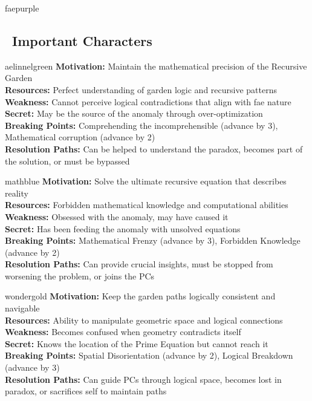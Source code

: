 \documentclass[11pt]{article}
\begin{document}
\begin{campaignsection}{faepurple}
\subsection*{\faUsers\ Important Characters}

\begin{npcbox}{aelinnelgreen}
\textbf{Motivation:} Maintain the mathematical precision of the Recursive Garden\\
\textbf{Resources:} Perfect understanding of garden logic and recursive patterns\\
\textbf{Weakness:} Cannot perceive logical contradictions that align with fae nature\\
\textbf{Secret:} May be the source of the anomaly through over-optimization\\
\textbf{Breaking Points:} Comprehending the incomprehensible (advance by 3), Mathematical corruption (advance by 2)\\
\textbf{Resolution Paths:} Can be helped to understand the paradox, becomes part of the solution, or must be bypassed
\end{npcbox}

\begin{npcbox}{mathblue}
\textbf{Motivation:} Solve the ultimate recursive equation that describes reality\\
\textbf{Resources:} Forbidden mathematical knowledge and computational abilities\\
\textbf{Weakness:} Obsessed with the anomaly, may have caused it\\
\textbf{Secret:} Has been feeding the anomaly with unsolved equations\\
\textbf{Breaking Points:} Mathematical Frenzy (advance by 3), Forbidden Knowledge (advance by 2)\\
\textbf{Resolution Paths:} Can provide crucial insights, must be stopped from worsening the problem, or joins the PCs
\end{npcbox}

\begin{npcbox}{wondergold}
\textbf{Motivation:} Keep the garden paths logically consistent and navigable\\
\textbf{Resources:} Ability to manipulate geometric space and logical connections\\
\textbf{Weakness:} Becomes confused when geometry contradicts itself\\
\textbf{Secret:} Knows the location of the Prime Equation but cannot reach it\\
\textbf{Breaking Points:} Spatial Disorientation (advance by 2), Logical Breakdown (advance by 3)\\
\textbf{Resolution Paths:} Can guide PCs through logical space, becomes lost in paradox, or sacrifices self to maintain paths
\end{npcbox}


\end{campaignsection}
\end{document}
